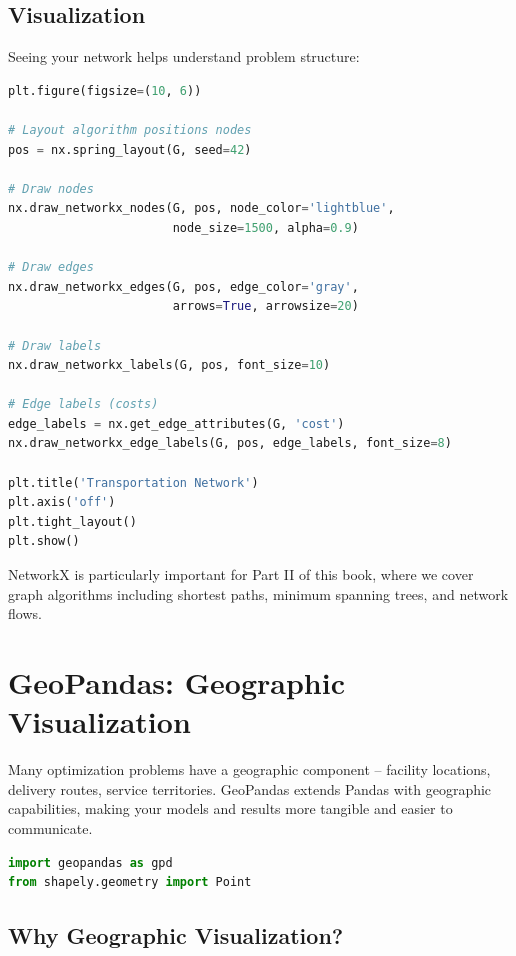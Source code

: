 \subsection{Visualization}

Seeing your network helps understand problem structure:

\begin{lstlisting}[language=Python]
plt.figure(figsize=(10, 6))

# Layout algorithm positions nodes
pos = nx.spring_layout(G, seed=42)

# Draw nodes
nx.draw_networkx_nodes(G, pos, node_color='lightblue',
                       node_size=1500, alpha=0.9)

# Draw edges
nx.draw_networkx_edges(G, pos, edge_color='gray',
                       arrows=True, arrowsize=20)

# Draw labels
nx.draw_networkx_labels(G, pos, font_size=10)

# Edge labels (costs)
edge_labels = nx.get_edge_attributes(G, 'cost')
nx.draw_networkx_edge_labels(G, pos, edge_labels, font_size=8)

plt.title('Transportation Network')
plt.axis('off')
plt.tight_layout()
plt.show()
\end{lstlisting}

\begin{info}
NetworkX is particularly important for Part II of this book, where we cover graph algorithms including shortest paths, minimum spanning trees, and network flows.
\end{info}

\section{GeoPandas: Geographic Visualization}

Many optimization problems have a geographic component -- facility locations, delivery routes, service territories. GeoPandas extends Pandas with geographic capabilities, making your models and results more tangible and easier to communicate.

\begin{lstlisting}[language=Python]
import geopandas as gpd
from shapely.geometry import Point
\end{lstlisting}

\subsection{Why Geographic Visualization?}

